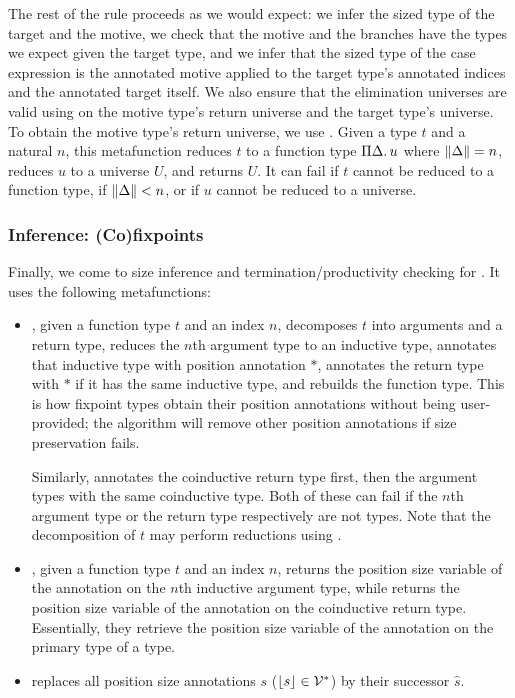 The rest of the rule proceeds as we would expect: we infer the sized type of the target and the motive, we check that the motive and the branches have the types we expect given the target type, and we infer that the sized type of the case expression is the annotated motive applied to the target type's annotated indices and the annotated target itself.
We also ensure that the elimination universes are valid using \elim on the motive type's return universe and the target type's universe.
To obtain the motive type's return universe, we use \decompose.
Given a type $t$ and a natural $n$, this metafunction reduces $t$ to a function type $\Pi \Delta \mathpunct{.} u$ where $\lVert\Delta\rVert = n$, reduces $u$ to a universe $U$, and returns $U$.
It can fail if $t$ cannot be reduced to a function type, if $\lVert\Delta\rVert < n$, or if $u$ cannot be reduced to a universe.

\subsubsection{Inference: (Co)fixpoints}

Finally, we come to size inference and termination/productivity checking for \cofixpoints.
It uses the following metafunctions:
\begin{itemize}
  \item \setrecstars, given a function type $t$ and an index $n$, decomposes $t$ into arguments and a return type, reduces the $n$th argument type to an inductive type, annotates that inductive type with position annotation $*$, annotates the return type with $*$ if it has the same inductive type, and rebuilds the function type.
    This is how fixpoint types obtain their position annotations without being user-provided; the algorithm will remove other position annotations if size preservation fails.

    Similarly, \setcorecstars annotates the coinductive return type first, then the argument types with the same coinductive type.
    Both of these can fail if the $n$th argument type or the return type respectively are not \coinductive types.
    Note that the decomposition of $t$ may perform reductions using \whnf.
  \item \getrecvar, given a function type $t$ and an index $n$, returns the position size variable of the annotation on the $n$th inductive argument type, while \getcorecvar returns the position size variable of the annotation on the coinductive return type.
    Essentially, they retrieve the position size variable of the annotation on the primary \corecursive type of a \cofixpoint type.
  \item \shift replaces all position size annotations $s$ (\ie $\lfloor s\rfloor \in \mathcal{V}^*$) by their successor $\hat{s}$.
\end{itemize}

